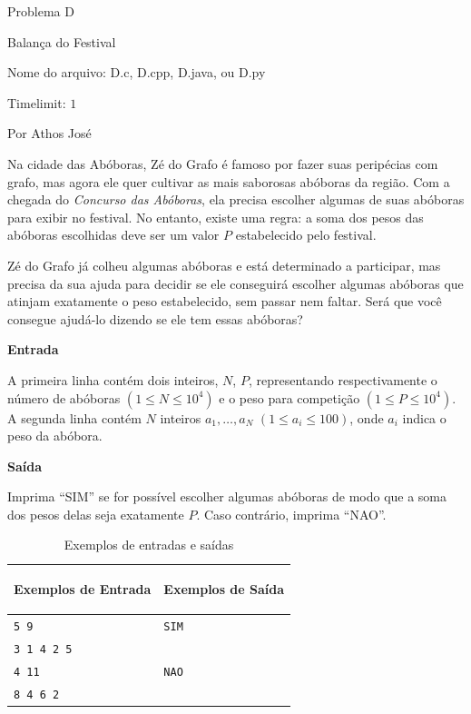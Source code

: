 \begin{center}
Problema D

Balança do Festival

{\small Nome do arquivo: D.c, D.cpp, D.java, ou D.py}

{\large Timelimit: $1$}

{\tiny Por Athos José}


\end{center}

Na cidade das Abóboras, Zé do Grafo é famoso por fazer suas peripécias com grafo, mas agora ele quer cultivar as mais saborosas abóboras da região. Com a chegada do \textit{Concurso das Abóboras}, ela precisa escolher algumas de suas abóboras para exibir no festival. No entanto, existe uma regra: a soma dos pesos das abóboras escolhidas deve ser um valor $P$ estabelecido pelo festival.

Zé do Grafo já colheu algumas abóboras e está determinado a participar, mas precisa da sua ajuda para decidir se ele conseguirá escolher algumas abóboras que atinjam exatamente o peso estabelecido, sem passar nem faltar. Será que você consegue ajudá-lo dizendo se ele tem essas abóboras?

\vspace{0.3cm}
\textbf{Entrada}

A primeira linha contém dois inteiros, $N$, $P$, representando respectivamente o número de abóboras $(1 \leq N \leq 10^4)$ e o peso para competição $(1 \leq P \leq 10^4)$. A segunda linha contém $N$ inteiros $a_1, \dots, a_N$ $(1 \leq a_i \leq 100)$, onde $a_i$ indica o peso da abóbora.

\vspace{0.3cm}
\textbf{Saída}

Imprima ``SIM'' se for possível escolher algumas abóboras de modo que a soma dos pesos delas seja exatamente $P$. Caso contrário, imprima ``NAO''.

\begin{table}[h]
    \centering
    \begin{tabular}{|p{7cm}|p{7cm}|}
       \hline
        \begin{center}
            \vspace{-0.3cm}
            \textbf{Exemplos de Entrada}
            \vspace{-0.3cm}
        \end{center} 
         &  
        \begin{center}
            \vspace{-0.3cm}
            \textbf{Exemplos de Saída}
            \vspace{-0.3cm}
        \end{center} \\ \hline
         \texttt{5 9} & \texttt{SIM} \\  
         \texttt{3 1 4 2 5} & \\
         \hline
         \texttt{4 11} & \texttt{NAO} \\  
         \texttt{8 4 6 2} & \\
         \hline
    \end{tabular}
    \caption{Exemplos de entradas e saídas}
\end{table}

\newpage

\begin{center}
\noindent

\end{center}